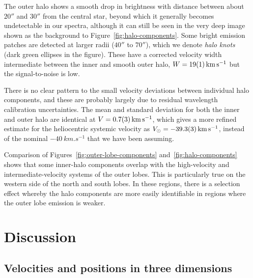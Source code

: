\documentclass[useAMS, usenatbib]{mnras}
\begin{document}
The outer halo shows a smooth drop in brightness with distance
between about \(20''\) and \(30''\) from the central star,
beyond which it generally becomes undetectable in our spectra,
although it can still be seen in the very deep image shown as the background to Figure~\ref{fig:halo-components}.
Some bright emission patches are detected at larger radii
(\(40''\) to \(70''\)),
which we denote \textit{halo knots} (dark green ellipses in the figure).
These have a corrected velocity width intermediate between the inner and smooth outer halo,
\(W = \SI{19 \pm 1}{km.s^{-1}}\) but the signal-to-noise is low.

There is no clear pattern to the small velocity deviations between individual halo components,
and these are probably largely due to residual wavelength calibration uncertainties.
The mean and standard deviation for both the inner and outer halo are identical at \(V = \SI{+0.7 \pm 0.3}{km.s^{-1}}\),
which gives a more refined estimate for the heliocentric systemic velocity as
\(V_\odot = \SI{-39.3 \pm 0.3}{km.s^{-1}} \),
instead of the nominal \(\SI{-40}{km.s^{-1}}\) that we have been assuming.

Comparison of Figures~\ref{fig:outer-lobe-components} and~\ref{fig:halo-components}
shows that some inner-halo components overlap with the high-velocity and intermediate-velocity systems of the outer lobes.
This is particularly true on the western side of the north and south lobes.
In these regions, there is a selection effect whereby
the halo components are more easily identifiable in regions where the outer lobe emission is weaker. 

\section{Discussion}
\label{sec:discussion}

\subsection{Velocities and positions in three dimensions}
\label{sec:veloc-posit-three}
\end{document}
